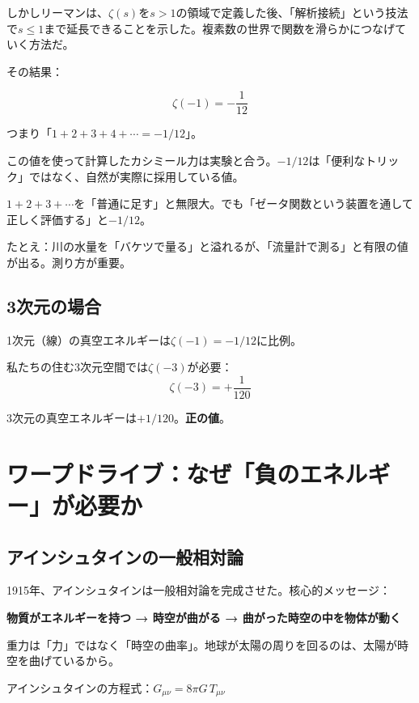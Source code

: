 \documentclass[12pt,a4paper]{article}
\begin{document}
しかしリーマンは、$\zeta(s)$を$s > 1$の領域で定義した後、「解析接続」という技法で$s \leq 1$まで延長できることを示した。複素数の世界で関数を滑らかにつなげていく方法だ。

その結果：

$$\zeta(-1) = -\frac{1}{12}$$

つまり「$1 + 2 + 3 + 4 + \cdots = -1/12$」。

\begin{storybox}[信じがたいが物理的に正しい]
この値を使って計算したカシミール力は実験と合う。$-1/12$は「便利なトリック」ではなく、自然が実際に採用している値。

$1+2+3+\cdots$を「普通に足す」と無限大。でも「ゼータ関数という装置を通して正しく評価する」と$-1/12$。

たとえ：川の水量を「バケツで量る」と溢れるが、「流量計で測る」と有限の値が出る。測り方が重要。
\end{storybox}

\subsection{3次元の場合}

1次元（線）の真空エネルギーは$\zeta(-1) = -1/12$に比例。

私たちの住む3次元空間では$\zeta(-3)$が必要：
$$\zeta(-3) = +\frac{1}{120}$$

3次元の真空エネルギーは$+1/120$。\textbf{正の値}。

\section{ワープドライブ：なぜ「負のエネルギー」が必要か}

\subsection{アインシュタインの一般相対論}

1915年、アインシュタインは一般相対論を完成させた。核心的メッセージ：

\begin{deepbox}[一般相対論]
\textbf{物質がエネルギーを持つ → 時空が曲がる → 曲がった時空の中を物体が動く}

重力は「力」ではなく「時空の曲率」。地球が太陽の周りを回るのは、太陽が時空を曲げているから。
\end{deepbox}

アインシュタインの方程式：$G_{\mu\nu} = 8\pi G \, T_{\mu\nu}$
\end{document}
